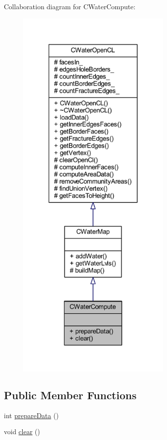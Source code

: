 Collaboration diagram for C\+Water\+Compute\+:
\nopagebreak
\begin{figure}[H]
\begin{center}
\leavevmode
\includegraphics[width=217pt]{class_c_water_compute__coll__graph}
\end{center}
\end{figure}
\subsection*{Public Member Functions}
\begin{DoxyCompactItemize}
\item 
int \mbox{\hyperlink{class_c_water_compute_a5486835df389547dea8403401738c071}{prepare\+Data}} ()
\item 
void \mbox{\hyperlink{class_c_water_compute_a6afba6407dd75a22e2beeac9472fdf6c}{clear}} ()
\end{DoxyCompactItemize}
